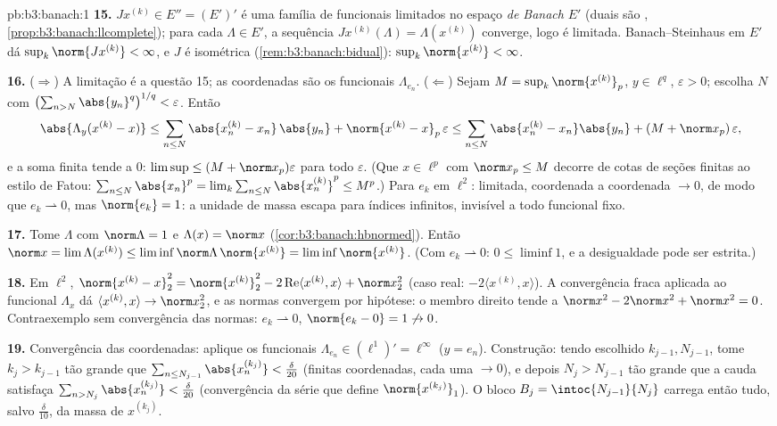 \begin{solution}{pb:b3:banach:1}
\textbf{15.} $J x^{(k)} \in E'' = (E')'$ é uma família de
funcionais limitados no espaço \emph{de Banach} $E'$ (duais
são , \cref{prop:b3:banach:llcomplete}); para cada
$\Lambda \in E'$, a sequência $Jx^{(k)}(\Lambda) =
\Lambda(x^{(k)})$ converge, logo é limitada.
Banach--Steinhaus em $E'$ dá $\sup_k\norm{Jx^{(k)}} <
\infty$, e $J$ é isométrica
(\cref{rem:b3:banach:bidual}): $\sup_k\norm{x^{(k)}} <
\infty$.

\textbf{16.} ($\Rightarrow$) A limitação é a questão 15;
as coordenadas são os funcionais $\Lambda_{e_n}$.
($\Leftarrow$) Sejam $M = \sup_k\norm{x^{(k)}}_p$, $y \in
\ell^q$, $\varepsilon > 0$; escolha $N$ com
$\bigl(\sum_{n>N}\abs{y_n}^q\bigr)^{1/q} < \varepsilon$. Então
\[
\abs{\Lambda_y(x^{(k)} - x)} \leq
\sum_{n\leq N}\abs{x^{(k)}_n - x_n}\,\abs{y_n} +
\norm{x^{(k)} - x}_p\,\varepsilon
\leq \sum_{n\leq N}\abs{x^{(k)}_n - x_n}\abs{y_n} +
(M + \norm x_p)\,\varepsilon,
\]
e a soma finita tende a $0$: $\limsup \leq (M + \norm
x_p)\varepsilon$ para todo $\varepsilon$. (Que $x \in
\ell^p$ com $\norm x_p \leq M$ decorre de cotas de seções finitas
ao estilo de Fatou: $\sum_{n \leq N}\abs{x_n}^p =
\lim_k\sum_{n\leq N}\abs{x^{(k)}_n}^p \leq M^p$.) Para $e_k$
em $\ell^2$: limitada, coordenada a coordenada $\to 0$, de modo que $e_k
\rightharpoonup 0$, mas $\norm{e_k} = 1$: a unidade de massa
escapa para índices infinitos, invisível a todo funcional
fixo.

\textbf{17.} Tome $\Lambda$ com $\norm\Lambda = 1$ e
$\Lambda(x) = \norm x$ (\cref{cor:b3:banach:hbnormed}). Então
$\norm x = \lim\Lambda(x^{(k)}) \leq
\liminf\norm\Lambda\,\norm{x^{(k)}} =
\liminf\norm{x^{(k)}}$. (Com $e_k \rightharpoonup 0$: $0
\leq \liminf 1$, e a desigualdade pode ser estrita.)

\textbf{18.} Em $\ell^2$, $\norm{x^{(k)} - x}_2^2 =
\norm{x^{(k)}}_2^2 - 2\operatorname{Re}\langle x^{(k)},
x\rangle + \norm x_2^2$ (caso real: $-2\langle x^{(k)},
x\rangle$). A convergência fraca aplicada ao funcional
$\Lambda_x$ dá $\langle x^{(k)}, x\rangle \to \norm
x_2^2$, e as normas convergem por hipótese: o membro direito
tende a $\norm x^2 - 2\norm x^2 + \norm x^2 = 0$.
Contraexemplo sem convergência das normas: $e_k
\rightharpoonup 0$, $\norm{e_k - 0} = 1 \not\to 0$.

\textbf{19.} Convergência das coordenadas: aplique os funcionais
$\Lambda_{e_n} \in (\ell^1)' = \ell^\infty$ ($y = e_n$).
Construção: tendo escolhido $k_{j-1}, N_{j-1}$, tome $k_j >
k_{j-1}$ tão grande que $\sum_{n \leq
N_{j-1}}\abs{x^{(k_j)}_n} < \frac\delta{20}$ (finitas
coordenadas, cada uma $\to 0$), e depois $N_j > N_{j-1}$ tão grande
que a cauda satisfaça $\sum_{n > N_j}\abs{x^{(k_j)}_n} <
\frac\delta{20}$ (convergência da série que define
$\norm{x^{(k_j)}}_1$). O bloco $B_j = \intoc{N_{j-1}}{N_j}$
carrega então tudo, salvo $\frac\delta{10}$, da massa de
$x^{(k_j)}$.


\end{solution}
